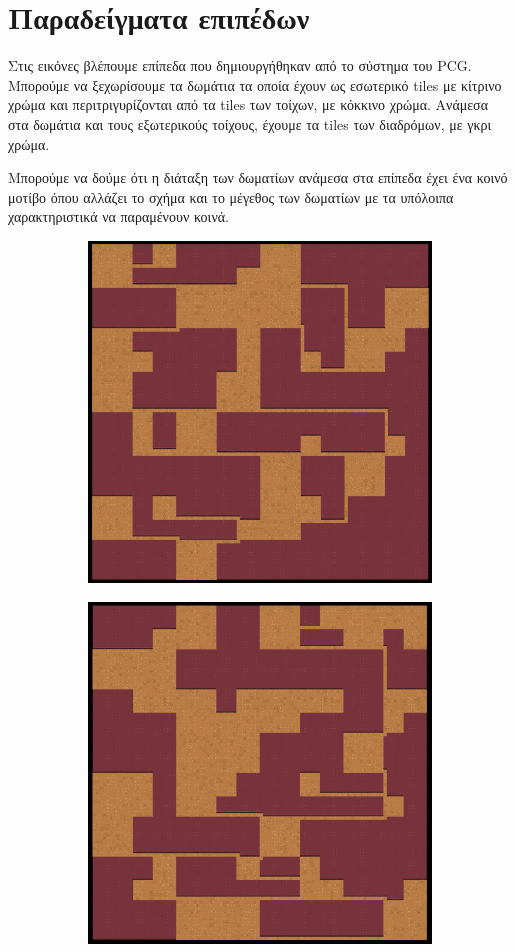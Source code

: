 \section{Παραδείγματα επιπέδων}
\par
Στις εικόνες βλέπουμε επίπεδα που δημιουργήθηκαν από το σύστημα του PCG. Μπορούμε να ξεχωρίσουμε τα δωμάτια τα οποία έχουν ως εσωτερικό tiles με κίτρινο χρώμα και περιτριγυρίζονται από τα tiles των τοίχων, με κόκκινο χρώμα. Ανάμεσα στα δωμάτια και τους εξωτερικούς τοίχους, έχουμε τα tiles των διαδρόμων, με γκρι χρώμα. 
\par
Μπορούμε να δούμε ότι η διάταξη των δωματίων ανάμεσα στα επίπεδα έχει ένα κοινό μοτίβο όπου αλλάζει το σχήμα και το μέγεθος των δωματίων με τα υπόλοιπα χαρακτηριστικά να παραμένουν κοινά.

\begin{figure}[H]
\begin{subfigure}{.5\textwidth}
  \centering
  \includegraphics[width=.8\linewidth]{../images/pcg_quadtree/pcg1.png}
  \label{fig:sfig1}
\end{subfigure}%
\begin{subfigure}{.5\textwidth}
  \centering
  \includegraphics[width=.8\linewidth]{../images/pcg_quadtree/pcg2.png}

\end{subfigure}
\end{figure}
